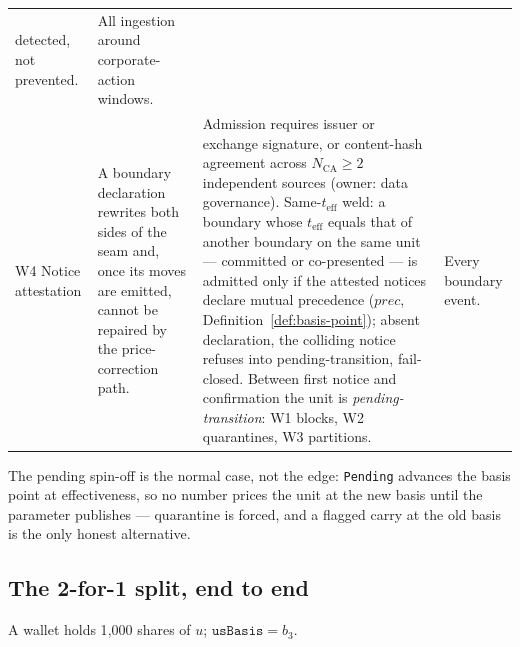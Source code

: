 \begin{center}
\begin{longtable}{@{}p{2.2cm} p{3.6cm} p{4.7cm} p{2.9cm}@{}}
detected, not prevented. & All ingestion around corporate-action windows. \\
\addlinespace
W4 Notice attestation & A boundary declaration rewrites both sides of the seam and,
once its moves are emitted, cannot be repaired by the price-correction path. & Admission
requires issuer or exchange signature, or content-hash agreement across
$N_{\mathrm{CA}}\ge2$ independent sources (owner: data governance). Same-$t_{\mathrm{eff}}$
weld: a boundary whose $t_{\mathrm{eff}}$ equals that of another boundary on the same
unit --- committed or co-presented --- is admitted only if the attested notices declare
mutual precedence ($\mathit{prec}$, Definition~\ref{def:basis-point}); absent
declaration, the colliding notice refuses into pending-transition, fail-closed. Between
first notice and confirmation the unit is \emph{pending-transition}: W1 blocks, W2
quarantines, W3 partitions. & Every boundary event. \\
\bottomrule
\end{longtable}
\end{center}

The pending spin-off is the normal case, not the edge: \texttt{Pending} advances the
basis point at effectiveness, so no number prices the unit at the new basis until the
parameter publishes --- quarantine is forced, and a flagged carry at the old basis is
the only honest alternative.

\subsection{The 2-for-1 split, end to end}
\label{sec:basis-worked}

A wallet holds 1{,}000 shares of $u$; $\texttt{usBasis}=b_3$.

